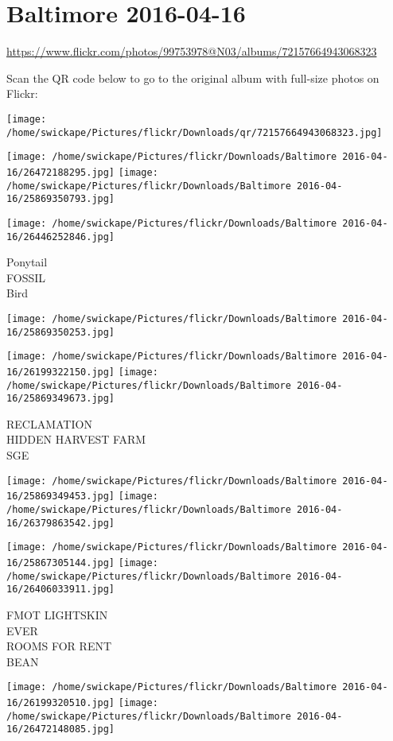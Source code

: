 \documentclass[10pt,letterpaper]{article}
\title{}
\author{}
\date{}
\begin{document}
\section*{Baltimore 2016-04-16}

\url{https://www.flickr.com/photos/99753978@N03/albums/72157664943068323}

Scan the QR code below to go to the original album with full-size photos on Flickr:

\texttt{[image: /home/swickape/Pictures/flickr/Downloads/qr/72157664943068323.jpg]}
\pagebreak

\texttt{[image: /home/swickape/Pictures/flickr/Downloads/Baltimore 2016-04-16/26472188295.jpg]}
\texttt{[image: /home/swickape/Pictures/flickr/Downloads/Baltimore 2016-04-16/25869350793.jpg]}

\texttt{[image: /home/swickape/Pictures/flickr/Downloads/Baltimore 2016-04-16/26446252846.jpg]}

Ponytail\\
FOSSIL\\
Bird
\pagebreak

\texttt{[image: /home/swickape/Pictures/flickr/Downloads/Baltimore 2016-04-16/25869350253.jpg]}

\vspace{0.25in}
\texttt{[image: /home/swickape/Pictures/flickr/Downloads/Baltimore 2016-04-16/26199322150.jpg]}
\texttt{[image: /home/swickape/Pictures/flickr/Downloads/Baltimore 2016-04-16/25869349673.jpg]}

RECLAMATION\\
HIDDEN HARVEST FARM\\
SGE
\pagebreak

\texttt{[image: /home/swickape/Pictures/flickr/Downloads/Baltimore 2016-04-16/25869349453.jpg]}
\texttt{[image: /home/swickape/Pictures/flickr/Downloads/Baltimore 2016-04-16/26379863542.jpg]}

\texttt{[image: /home/swickape/Pictures/flickr/Downloads/Baltimore 2016-04-16/25867305144.jpg]}
\texttt{[image: /home/swickape/Pictures/flickr/Downloads/Baltimore 2016-04-16/26406033911.jpg]}

FMOT LIGHTSKIN\\
EVER\\
ROOMS FOR RENT\\
BEAN
\pagebreak

\texttt{[image: /home/swickape/Pictures/flickr/Downloads/Baltimore 2016-04-16/26199320510.jpg]}
\texttt{[image: /home/swickape/Pictures/flickr/Downloads/Baltimore 2016-04-16/26472148085.jpg]}
\end{document}
